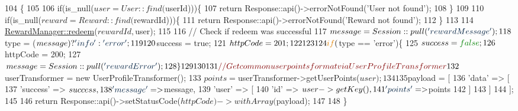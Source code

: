\begin{DoxyCode}
104     \{
105 
106         \textcolor{keywordflow}{if}(is\_null($user = User::find($userId)))\{
107             \textcolor{keywordflow}{return} Response::api()->errorNotFound(\textcolor{stringliteral}{'User not found'});
108         \}
109         
110         \textcolor{keywordflow}{if}(is\_null($reward = Reward::find($rewardId)))\{
111             \textcolor{keywordflow}{return} Response::api()->errorNotFound(\textcolor{stringliteral}{'Reward not found'});
112         \}
113         
114         \hyperlink{classDMA_1_1Friends_1_1Classes_1_1RewardManager_a2a1ce1d86e60454954229210c334e2bd}{RewardManager::redeem}($rewardId, $user);
115         
116         \textcolor{comment}{// Check if redeem was successful }
117         $message = Session::pull(\textcolor{stringliteral}{'rewardMessage'});
118         $type    = ($message) ? \textcolor{stringliteral}{'info'} : \textcolor{stringliteral}{'error'}; 
119         
120         $success = \textcolor{keyword}{true};
121         $httpCode = 201;
122         
123         
124         \textcolor{keywordflow}{if}($type == \textcolor{stringliteral}{'error'})\{
125             $success = \textcolor{keyword}{false};
126             $httpCode = 200;
127             $message = Session::pull(\textcolor{stringliteral}{'rewardError'});
128         \}
129         
130         
131         \textcolor{comment}{// Get common user points format via UserProfileTransformer}
132         $userTransformer = \textcolor{keyword}{new} UserProfileTransformer();
133         $points = $userTransformer->getUserPoints($user);
134 
135         $payload = [
136                 \textcolor{stringliteral}{'data'} => [
137                         \textcolor{stringliteral}{'success'} => $success,
138                         \textcolor{stringliteral}{'message'} => $message,
139                         \textcolor{stringliteral}{'user'} => [
140                             \textcolor{stringliteral}{'id'}      => $user->getKey(),
141                             \textcolor{stringliteral}{'points'}  => $points
142                         ]
143                 ]
144         ];
145         
146         \textcolor{keywordflow}{return} Response::api()->setStatusCode($httpCode)->withArray($payload);
147 
148     \}
\end{DoxyCode}
\hypertarget{classDMA_1_1Friends_1_1API_1_1Resources_1_1RewardResource_a5979a6696b2dbd4561043a44508f583d}{}
